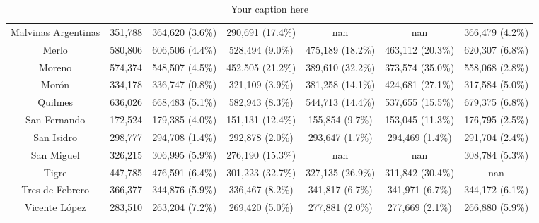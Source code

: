 \begin{table}[htb]
\begin{tabular}{|c|c|c|c|c|c|c|}
Malvinas Argentinas & 351,788 & 364,620 (3.6\%) & 290,691 (17.4\%) & nan & nan & 366,479 (4.2\%) \\
Merlo & 580,806 & 606,506 (4.4\%) & 528,494 (9.0\%) & 475,189 (18.2\%) & 463,112 (20.3\%) & 620,307 (6.8\%) \\
Moreno & 574,374 & 548,507 (4.5\%) & 452,505 (21.2\%) & 389,610 (32.2\%) & 373,574 (35.0\%) & 558,068 (2.8\%) \\
Morón & 334,178 & 336,747 (0.8\%) & 321,109 (3.9\%) & 381,258 (14.1\%) & 424,681 (27.1\%) & 317,584 (5.0\%) \\
Quilmes & 636,026 & 668,483 (5.1\%) & 582,943 (8.3\%) & 544,713 (14.4\%) & 537,655 (15.5\%) & 679,375 (6.8\%) \\
San Fernando & 172,524 & 179,385 (4.0\%) & 151,131 (12.4\%) & 155,854 (9.7\%) & 153,045 (11.3\%) & 176,795 (2.5\%) \\
San Isidro & 298,777 & 294,708 (1.4\%) & 292,878 (2.0\%) & 293,647 (1.7\%) & 294,469 (1.4\%) & 291,704 (2.4\%) \\
San Miguel & 326,215 & 306,995 (5.9\%) & 276,190 (15.3\%) & nan & nan & 308,784 (5.3\%) \\
Tigre & 447,785 & 476,591 (6.4\%) & 301,223 (32.7\%) & 327,135 (26.9\%) & 311,842 (30.4\%) & nan \\
Tres de Febrero & 366,377 & 344,876 (5.9\%) & 336,467 (8.2\%) & 341,817 (6.7\%) & 341,971 (6.7\%) & 344,172 (6.1\%) \\
Vicente López & 283,510 & 263,204 (7.2\%) & 269,420 (5.0\%) & 277,881 (2.0\%) & 277,669 (2.1\%) & 266,880 (5.9\%) \\
\hline
\end{tabular}
\caption{Your caption here}
\label{tab:my_table}
\end{table}
